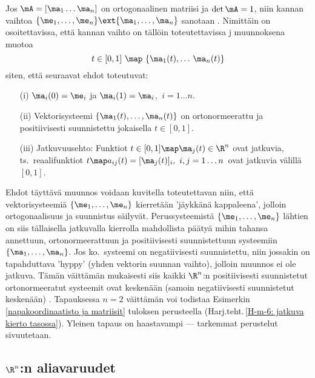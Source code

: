 Jos $\mA=[\ma_1 \ldots \ma_n]$ on ortogonaalinen matriisi ja $\det\mA=1$, niin kannan vaihtoa
$\{\me_1,\ldots,\me_n\} \ext \{\ma_1,\ldots,\ma_n\}$ sanotaan .
Nimittäin on osoitettavissa, että kannan vaihto on tällöin toteutettavissa j 
muunnoksena muotoa
\[
t\in[0,1]\ \map\ \{\ma_1(t),\ldots\,\ma_n(t)\}
\]
siten, että seuraavat ehdot toteutuvat:
\begin{itemize}
\item[(i)]   $\ma_i(0)=\me_i$ ja $\ma_i(1)=\ma_i$, $\ i=1 \ldots n$.
\item[(ii)]  Vektorisysteemi $\{\ma_1(t),\ldots,\ma_n(t)\}$ on ortonormeerattu ja positiivisesti
             suunnistettu jokaisella $t\in[0,1]$.
\item[(iii)] Jatkuvuusehto: Funktiot $t\in[0,1]\map\ma_j(t)\in\R^n$ ovat jatkuvia, ts.\
             reaalifunktiot $t \map a_{ij}(t)=[\ma_j(t)]_i,\ i,j=1 \ldots n\,$ ovat jatkuvia 
             välillä $[0,1]$. 
\end{itemize}
Ehdot täyttävä muunnos voidaan kuvitella toteutettavan niin, että vektorisysteemiä
$\{\me_1,\ldots,\me_n\}$ kierretään 'jäykkänä kappaleena', jolloin ortogonaalisuus ja suunnistus
säilyvät. Perussysteemistä $\{\me_1,\ldots,\me_n\}$ lähtien on siis tällaisella jatkuvalla 
kierrolla mahdollista päätyä mihin tahansa annettuun, ortonormeerattuun ja positiivisesti 
suunnistettuun systeemiin $\{\ma_1,\ldots,\ma_n\}$. Jos ko.\ systeemi on negatiivisesti 
suunnistettu, niin jossakin on tapahduttava 'hyppy' (yhden vektorin suunnan vaihto), jolloin 
muunnos ei ole jatkuva. Tämän väittämän mukaisesti siis kaikki $\R^n$:n positiivisesti 
suunnistetut ortonormeeratut systeemit ovat keskenään (samoin negatiivisesti suunnistetut 
\index{kiertoekvivalenssi}%
keskenään) . Tapauksessa $n=2$ väittämän voi todistaa
Esimerkin \ref{napakoordinaatisto ja matriisit} tuloksen perusteella 
(Harj.teht.\,\ref{H-m-6: jatkuva kierto tasossa}). Yleinen tapaus on haastavampi --- tarkemmat
perustelut sivuutetaan.

\subsection*{$\R^n$:n aliavaruudet}

